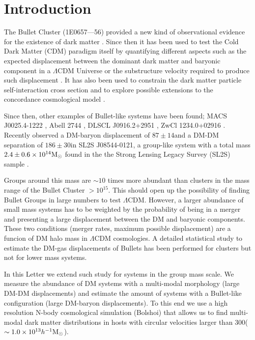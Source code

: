 \documentclass{emulateapj}
\newcommand{\hkpc}{{\ifmmode{h^{-1}{\rm kpc}}\else{$h^{-1}$kpc }\fi}}
\newcommand{\hMsun}{{\ifmmode{h^{-1}{\rm {M_{\odot}}}}\else{$h^{-1}{\rm{M_{\odot}}}$}\fi}}
\newcommand{\Msun}{{\ifmmode{{\rm {M_{\odot}}}}\else{${\rm{M_{\odot}}}$}\fi}}
\newcommand{\kms}{{\ifmmode{{\mathrm{\,km\ s}^{-1}}}\else{\,km~s$^{-1}$}\fi}}
\newcommand{\bulla}{1E0657---56}
\newcommand{\bullg}{SL2S J08544-0121}
\begin{document}
\section{Introduction}


The Bullet Cluster (\bulla) provided a new kind of observational
evidence for the existence of dark matter
\citep{Markevitch2004,Clowe2006}. Since then it has been used to test
the Cold Dark Matter (CDM) paradigm itself by quantifying different
aspects such as the expected displacement between the dominant dark
matter and baryonic component in a $\Lambda$CDM Universe
\citep{ForeroRomero2010} or the substructure velocity required to
produce such displacement \citep{Hayashi2006, Springel2007,
  Thompson2012}. It has also been used to constrain the dark matter
particle self-interaction cross section and to explore possible
extensions to the concordance cosmological model
\citep{Farrar2007,Lee2010,Lee2012}.      
 

Since then, other examples of Bullet-like systems have been found; 
MACS J0025.4-1222 \citep{Bradac2008}, Abell 2744 \citep{Merten2011},
DLSCL J0916.2+2951 \citep{Dawson2012}, ZwCl 1234.0+02916
\citep{Dahle2013}. Recently \citep{Gastaldello} observed a DM-baryon
displacement of $87\pm 14$\hkpc and a DM-DM separation of $186\pm
30$\hkpc in \bullg, a group-like system with a total
mass $2.4\pm 0.6 \times 10^{14}\Msun$ found in the the Strong Lensing
Legacy Survey (SL2S) sample \citep{Cabanac2007,More2012}.


Groups around this mass are $\sim10$ times more abundant than clusters
in the mass range of the Bullet Cluster $>10^{15}$\hMsun. This 
should open up the possibility of finding Bullet Groups in large
numbers to test $\Lambda$CDM. However, a larger abundance of small
mass systems has to be weighted by the probability of being in a
merger and  presenting a large displacement between the DM and
baryonic components.  These two conditions (merger rates, maximum
possible displacement) are a funcion of DM halo mass in $\Lambda$CDM
cosmologies.  A detailed statistical study to estimate the DM-gas
displacements of Bullets has been performed for clusters
\citep{ForeroRomero2010} but not for lower mass systems.

In this Letter we extend such study for systems in the group mass
scale. We measure the abundance of DM systems with a multi-modal
morphology (large DM-DM displacements) and estimate the amount of
systems with a Bullet-like configuration  (large DM-baryon
displacements). To this end we use a high resolution N-body
cosmological simulation (Bolshoi) that allows us to find  multi-modal
dark matter distributions in hosts with circular velocities larger
than $300$\kms ($\sim 1.0\times 10^{13}\hMsun$).
\end{document}
